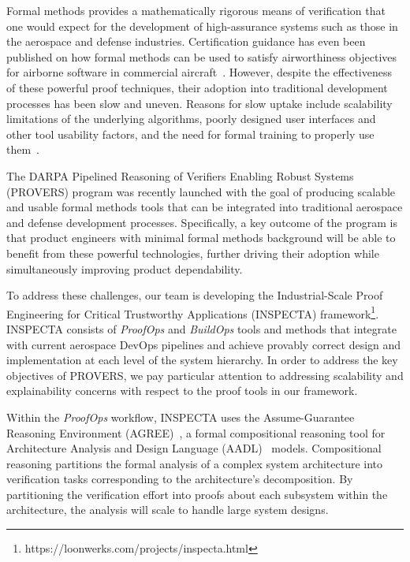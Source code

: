 Formal methods provides a mathematically rigorous means of verification that one would expect for the development of high-assurance systems such as those in the aerospace and defense industries. Certification guidance has even been published on how formal methods can be used to satisfy airworthiness objectives for airborne software in commercial aircraft~\cite{DO-333}.  However, despite the effectiveness of these powerful proof techniques, their adoption into traditional development processes has been slow and uneven.  Reasons for slow uptake include scalability limitations of the underlying algorithms, poorly designed user interfaces and other tool usability factors, and the need for formal training to properly use them~\cite{davis-fmics13}.

The DARPA Pipelined Reasoning of Verifiers Enabling Robust Systems (PROVERS) program was recently launched with the goal of producing scalable and usable formal methods tools that can be integrated into traditional aerospace and defense development processes.  Specifically, a key outcome of the program is that product engineers with minimal formal methods background will be able to benefit from these powerful technologies, further driving their adoption while simultaneously improving product dependability.

To address these challenges, our team is developing the Industrial-Scale Proof Engineering for Critical Trustworthy Applications (INSPECTA) framework\footnote{https://loonwerks.com/projects/inspecta.html}.  INSPECTA consists of \textit{ProofOps} and \textit{BuildOps} tools and methods that integrate with current aerospace DevOps pipelines and achieve provably correct design and implementation at each level of the system hierarchy.  In order to address the key objectives of PROVERS, we pay particular attention to addressing scalability and explainability concerns with respect to the proof tools in our framework.

Within the \textit{ProofOps} workflow, INSPECTA uses the Assume-Guarantee Reasoning Environment (AGREE)~\cite{compositional-analysis-agree}, a formal compositional reasoning tool for Architecture Analysis and Design Language (AADL)~\cite{feiler-aadl} models.
Compositional reasoning partitions the formal analysis of a complex system architecture into verification tasks corresponding to the architecture's decomposition.  By partitioning the verification effort into proofs about each subsystem within the architecture, the analysis will scale to handle large system designs.

